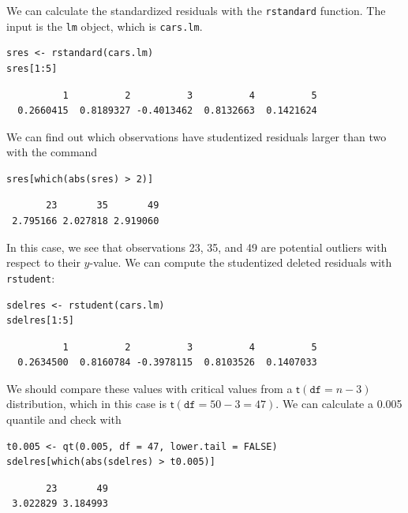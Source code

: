 \documentclass[captions=tableheading]{scrbook}
\begin{document}
We can calculate the standardized residuals with the \texttt{rstandard} function. The input is the \texttt{lm} object, which is \texttt{cars.lm}.


\lstset{language=R}
\begin{lstlisting}
sres <- rstandard(cars.lm)
sres[1:5]
\end{lstlisting}

\begin{verbatim}
          1          2          3          4          5 
  0.2660415  0.8189327 -0.4013462  0.8132663  0.1421624
\end{verbatim}

We can find out which observations have studentized residuals larger than two with the command


\lstset{language=R}
\begin{lstlisting}
sres[which(abs(sres) > 2)]
\end{lstlisting}

\begin{verbatim}
       23       35       49 
 2.795166 2.027818 2.919060
\end{verbatim}

In this case, we see that observations 23, 35, and 49 are potential outliers with respect to their \(y\)-value.  We can compute the studentized deleted residuals with \texttt{rstudent}:


\lstset{language=R}
\begin{lstlisting}
sdelres <- rstudent(cars.lm)
sdelres[1:5]
\end{lstlisting}

\begin{verbatim}
          1          2          3          4          5 
  0.2634500  0.8160784 -0.3978115  0.8103526  0.1407033
\end{verbatim}

We should compare these values with critical values from a \(\mathsf{t}(\mathtt{df}=n-3)\) distribution, which in this case is \(\mathsf{t}(\mathtt{df}=50-3=47)\). We can calculate a 0.005 quantile and check with 


\lstset{language=R}
\begin{lstlisting}
t0.005 <- qt(0.005, df = 47, lower.tail = FALSE)
sdelres[which(abs(sdelres) > t0.005)]
\end{lstlisting}

\begin{verbatim}
       23       49 
 3.022829 3.184993
\end{verbatim}
\end{document}
